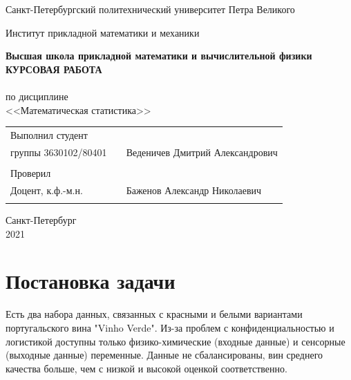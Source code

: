 \documentclass{article}
\begin{document}
\begin{titlepage}
  \begin{center}
    \large
    Санкт-Петербургский политехнический университет Петра Великого
    
    Институт прикладной математики и механики
    
    \textbf{Высшая школа прикладной математики и вычислительной физики}
    \vfill
    \textsc{\textbf{\Large{КУРСОВАЯ РАБОТА}}}\\[5mm]
    \\ по дисциплине
    \\ <<Математическая статистика>>\\
\end{center}

\vfill

\begin{tabular}{l p{} l}
Выполнил студент \\группы 3630102/80401 && Веденичев Дмитрий Александрович \\
\\
Проверил\\Доцент, к.ф.-м.н.& \hspace{0pt} &   Баженов Александр Николаевич \\\\
\end{tabular}

\hfill \break
\hfill \break
\begin{center} Санкт-Петербург \\2021 \end{center}
\thispagestyle{empty}
\end{titlepage}
\newpage
\newpage
\begin{center}
    \setcounter{page}{2}
    \tableofcontents
\end{center}
\newpage
\begin{center}
    \setcounter{page}{3}
    \listoffigures
\end{center}

\newpage

\section{Постановка задачи}
\noindent Есть два набора данных, связанных с красными и белыми вариантами португальского вина "Vinho Verde". Из-за проблем с конфиденциальностью и логистикой доступны только физико-химические (входные данные) и сенсорные (выходные данные) переменные. Данные не сбалансированы, вин среднего качества больше, чем с низкой и высокой оценкой соответственно.
\end{document}
